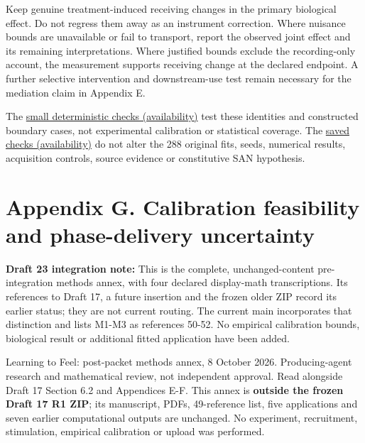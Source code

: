 \documentclass[
  american,
  11pt,
  letterpaper,
]{article}
\begin{document}
Keep genuine treatment-induced receiving changes in the primary biological effect. Do not regress them away as an instrument correction. Where nuisance bounds are unavailable or fail to transport, report the observed joint effect and its remaining interpretations. Where justified bounds exclude the recording-only account, the measurement supports receiving change at the declared endpoint. A further selective intervention and downstream-use test remain necessary for the mediation claim in Appendix E.

The \href{https://github.com/v5ma/v5ma.github.io/blob/master/papers/companions/learning-to-feel-v1.0/ARTIFACT-AVAILABILITY.md\#artifact-23}{small deterministic checks (availability)} test these identities and constructed boundary cases, not experimental calibration or statistical coverage. The \href{https://github.com/v5ma/v5ma.github.io/blob/master/papers/companions/learning-to-feel-v1.0/ARTIFACT-AVAILABILITY.md\#artifact-24}{saved checks (availability)} do not alter the 288 original fits, seeds, numerical results, acquisition controls, source evidence or constitutive SAN hypothesis.

\clearpage
\endgroup
\hypertarget{appendix-g}{}

\section{Appendix G. Calibration feasibility and phase-delivery uncertainty}\label{appendix-g.-calibration-feasibility-and-phase-delivery-uncertainty}

\textbf{Draft 23 integration note:} This is the complete, unchanged-content pre-integration methods annex, with four declared display-math transcriptions. Its references to Draft 17, a future insertion and the frozen older ZIP record its earlier status; they are not current routing. The current main incorporates that distinction and lists M1-M3 as references 50-52. No empirical calibration bounds, biological result or additional fitted application have been added.

Learning to Feel: post-packet methods annex, 8 October 2026. Producing-agent research and mathematical review, not independent approval. Read alongside Draft 17 Section 6.2 and Appendices E-F. This annex is \textbf{outside the frozen Draft 17 R1 ZIP}; its manuscript, PDFs, 49-reference list, five applications and seven earlier computational outputs are unchanged. No experiment, recruitment, stimulation, empirical calibration or upload was performed.
\end{document}
